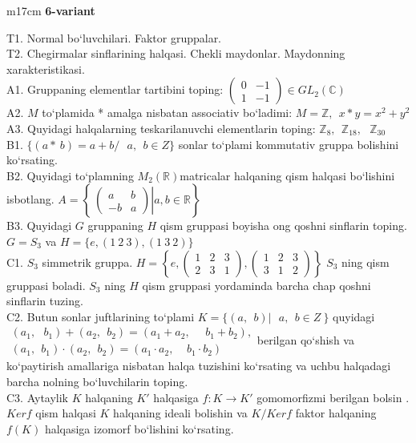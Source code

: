 \documentclass{article}
\begin{document}
\begin{tabular}{m{17cm}}
\textbf{6-variant}
\newline

T1. Normal bo`luvchilari. Faktor gruppalar. \\
T2. Chegirmalar sinflarining halqasi. Chekli maydonlar. Maydonning xarakteristikasi. \\
A1. Gruppaning elementlar tartibini toping: \(\begin{pmatrix}
0 & - 1 \\
1 & - 1
\end{pmatrix} \in GL_{2}(\mathbb{C})\) \\
A2. \(M\) to`plamida * amalga nisbatan associativ bo`ladimi: \(M\mathbb{= Z},\ \ x*y = x^{2} + y^{2}\) \\
A3. Quyidagi halqalarning teskarilanuvchi elementlarin toping: \(\mathbb{Z}_{8},\ \ \mathbb{Z}_{18},\ \ \ \mathbb{Z}_{30}\) \\
B1. \(\{(a*\ b) = a + b/\ \ \ a,\ \ b \in Z\}\) sonlar to`plami kommutativ gruppa bolishini ko`rsating. \\
B2. Quyidagi to`plamning \(M_{2}(\mathbb{R})\)matricalar halqaning qism halqasi bo`lishini isbotlang. \(A = \left\{ \left. \ \begin{pmatrix}
a & b \\
 - b & a
\end{pmatrix} \right|a,b\mathbb{\in R} \right\}\) \\
B3. Quyidagi \(G\) gruppaning \(H\) qism gruppasi boyisha o\textquotesingle ng qo\textquotesingle shni sinflarin toping. \(G = S_{3}\) va \(H = \{ e,(1\ 2\ 3),(1\ 3\ 2)\}\) \\
C1. \(S_{3}\) simmetrik gruppa. \(H = \left\{ e,\begin{pmatrix}
1 & 2 & 3 \\
2 & 3 & 1
\end{pmatrix},\begin{pmatrix}
1 & 2 & 3 \\
3 & 1 & 2
\end{pmatrix} \right\}\) \(S_{3}\) ning qism gruppasi boladi. \(S_{3}\) ning \(H\) qism gruppasi yordaminda barcha chap qo\textquotesingle shni sinflarin tuzing. \\
C2. Butun sonlar juftlarining to`plami \(K = \{(a,\ \ b)\left| \ \ \ a,\ \ b \in Z \right.\ \}\) quyidagi \(\begin{matrix}
(a_{1},\ \ \ b_{1}) + (a_{2},\ \ b_{2}) = (a_{1} + a_{2},\ \ \ \ \ \ b_{1} + b_{2}), \\
(a_{1},\ \ b_{1}) \cdot (a_{2},\ \ b_{2}) = (a_{1} \cdot a_{2},\ \ \ \ \ b_{1} \cdot b_{2})
\end{matrix}\)berilgan qo`shish va ko`paytirish amallariga nisbatan halqa tuzishini ko`rsating va uchbu halqadagi barcha nolning bo`luvchilarin toping. \\
C3. Aytaylik \(K\) halqaning \(K'\) halqasiga \(f:K \rightarrow K'\) gomomorfizmi berilgan bo\textquotesingle lsin . \(Kerf\) qism halqasi \(K\) halqaning ideali bo\textquotesingle lishin va \(K/Kerf\) faktor halqaning \(f(K)\) halqasiga izomorf bo`lishini ko`rsating. \\

\end{tabular}
\end{document}
